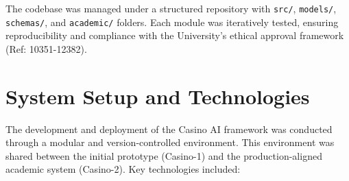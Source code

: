 \documentclass[12pt,a4paper]{report}
\begin{document}
The codebase was managed under a structured repository with \texttt{src/}, \texttt{models/}, \texttt{schemas/}, and \texttt{academic/} folders. Each module was iteratively tested, ensuring reproducibility and compliance with the University's ethical approval framework (Ref: 10351-12382).

\section{System Setup and Technologies}
\label{sec:system_setup}

The development and deployment of the Casino AI framework was conducted through a modular and version-controlled environment. This environment was shared between the initial prototype (Casino-1) and the production-aligned academic system (Casino-2). Key technologies included:
\end{document}
